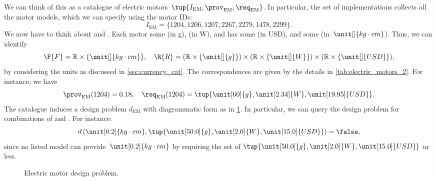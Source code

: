 \begin{example}
We can think of this as a catalogue of electric motors~$\tup{I_\mathrm{EM},\prov_\mathrm{EM},\req_\mathrm{EM}}$. In particular, the set of implementations collects all the motor models, which we can specify using the motor IDs:
\begin{equation}
    I_\mathrm{EM}=\{1204,1206,1207,2267,2279,1478,2299 \}.
\end{equation}
We now have to think about  and . Each motor  some  (in \unit[]{g}),  (in \unit[]{W}), and has some  (in USD), and  some  (in~$\unit[]{kg\cdot cm}$). Thus, we can identify
\begin{equation*}
\F{F}=\mathbb{R}\times \{\unit[]{kg\cdot cm}\},\quad \R{R}=(\mathbb{R}\times \{\unit[]{g}\})\times (\mathbb{R}\times \{\unit[]{W}\})\times (\mathbb{R}\times \{\unit[]{USD}\}),
\end{equation*}
by considering the units as discussed in \cref{sec:currency_cat}. The correspondences are given by the details in \cref{tab:electric_motors_2}. For instance, we have
\begin{equation}
    \prov_\mathrm{EM}(1204)=0.18, \quad \req_\mathrm{EM}(1204)=\tup{\unit[60]{g},\unit[2.34]{W},\unit[19.95]{USD}}.
\end{equation}
The catalogue induces a design problem $d_\mathrm{EM}$ with diagrammatic form as in \cref{fig:dp_em}. In particular, we can query the design problem for combinations of  and . For instance:
\begin{equation}
    d\left(\unit[0.2]{kg\cdot cm}, \tup{\unit[50.0]{g},\unit[2.0]{W},\unit[15.0]{USD}} \right)=\false,
\end{equation}
since no listed model can provide~$\unit[0.2]{kg\cdot cm}$  by requiring the set of  $\tup{\unit[50.0]{g},\unit[2.0]{W},\unit[15.0]{USD}}$ or less.

\begin{figure}[tbh]
\begin{center}
\end{center}
\caption{Electric motor design problem.\label{fig:dp_em}}
\end{figure}


\end{example}
